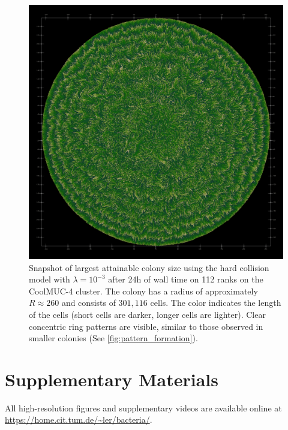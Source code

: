 \documentclass[conference]{IEEEtran}
\begin{document}
\begin{figure}[h]
    \centering
    \includegraphics[width=1\linewidth]{figures/huge/huge_hard.jpeg}

    \caption{Snapshot of largest attainable colony size using the hard collision model with $\lambda=10^{-3}$ after 24h of wall time on 112 ranks on the CoolMUC-4 cluster. The colony has a radius of approximately $R \approx 260$ and consists of $301{,}116$ cells. The color indicates the length of the cells (short cells are darker, longer cells are lighter). Clear concentric ring patterns are visible, similar to those observed in smaller colonies (See \autoref{fig:pattern_formation}).}
    \label{fig:huge_colony_hard}
\end{figure}

\section*{Supplementary Materials}

All high-resolution figures and supplementary videos are available online at \url{https://home.cit.tum.de/~ler/bacteria/}.
\end{document}
